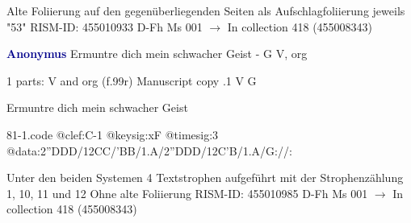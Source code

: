 \documentclass[twocolumn]{book}
\begin{document}
\newline Alte Foliierung auf den gegenüberliegenden Seiten als Aufschlagfoliierung jeweils "53"
\newline RISM-ID: 455010933
\newline D-Fh  Ms 001
\newline $\rightarrow$ In collection 418 (455008343)
      
\newline \par \vspace{7pt} \textcolor{darkblue}{\textbf{Anonymus  }}
\newline Ermuntre dich mein schwacher Geist - G
\newline V, org
\newline \begin{itshape}\end{itshape} 
\newline \textcolor{darkblue}{}  1 parts: V and org  (f.99r)
\newline Manuscript copy
.1  V  G
\newline \begin{footnotesize} Ermuntre dich mein schwacher Geist \end{footnotesize}  
\begin{filecontents*}{81-1.code}
@clef:C-1
@keysig:xF
@timesig:3
@data:2''DDD/12CC/'BB/1.A/2''DDD/12C'B/1.A/G://:
\end{filecontents*}
\newline
%

\newline Unter den beiden Systemen 4 Textstrophen aufgeführt mit der Strophenzählung 1, 10, 11 und 12
\newline Ohne alte Foliierung
\newline RISM-ID: 455010985
\newline D-Fh  Ms 001
\newline $\rightarrow$ In collection 418 (455008343)
      
\end{document}
